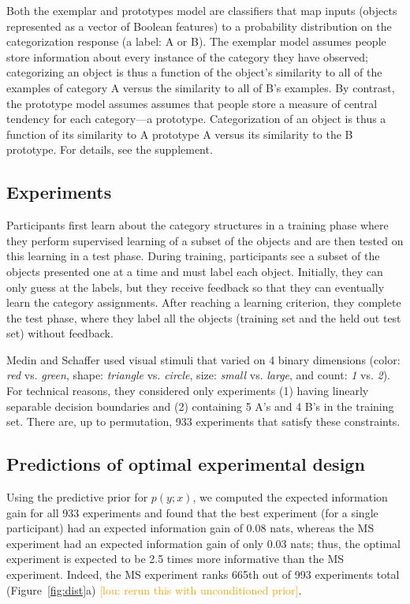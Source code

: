 \documentclass{article}
\newcommand{\lou}[1]{\textcolor{orange}{[lou: #1]}}
\begin{document}
Both the exemplar and prototypes model are classifiers that map inputs (objects represented as a vector of Boolean features) to a probability distribution on the categorization response (a label: A or B).
The exemplar model assumes people store information about every instance of the category they have observed; categorizing an object is thus a function of the object's similarity to all of the examples of category A versus the similarity to all of B's examples.
By contrast, the prototype model assumes assumes that people store a measure of central tendency for each category---a prototype.
Categorization of an object is thus a function of its similarity to A prototype  A versus its similarity to the B prototype.
For details, see the supplement.

\subsection{Experiments}

Participants first learn about the category structures in a training phase where they perform supervised learning of a subset of the objects and are then tested on this learning in a test phase.
During training, participants see a subset of the objects presented one at a time and must label each object.
Initially, they can only guess at the labels, but they receive feedback so that they can eventually learn the category assignments.
After reaching a learning criterion, they complete the test phase, where they label all the objects (training set and the held out test set) without feedback.

Medin and Schaffer used visual stimuli that varied on 4 binary dimensions (color: \emph{red} vs. \emph{green}, shape: \emph{triangle} vs. \emph{circle}, size: \emph{small} vs. \emph{large}, and count: \emph{1} vs. \emph{2}).
For technical reasons, they considered only experiments (1) having linearly separable decision boundaries and (2) containing 5 A's and 4 B's in the training set.
There are, up to permutation, 933 experiments that satisfy these constraints.

\subsection{Predictions of optimal experimental design}

Using the predictive prior for $p(y; x)$, we computed the expected information gain for all 933 experiments and found that the best experiment (for a single participant) had an expected information gain of 0.08 nats, whereas the MS experiment had an expected information gain of only 0.03 nats; thus, the optimal experiment is expected to be 2.5 times more informative than the MS experiment.
Indeed, the MS experiment ranks 665th out of 993 experiments total (Figure~\ref{fig:dist}a) \lou{rerun this with unconditioned prior}.
\end{document}
